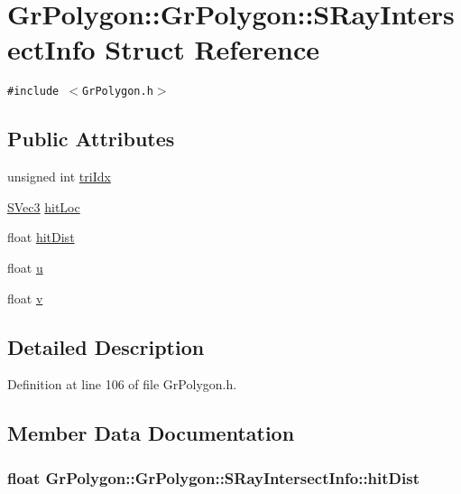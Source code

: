 \hypertarget{struct_gr_polygon_1_1_s_ray_intersect_info}{
\section{GrPolygon::GrPolygon::SRayIntersectInfo Struct Reference}
\label{struct_gr_polygon_1_1_s_ray_intersect_info}
}
{\tt \#include $<$GrPolygon.h$>$}

\subsection*{Public Attributes}
\begin{CompactItemize}
\item 
unsigned int \hyperlink{struct_gr_polygon_1_1_s_ray_intersect_info_c4b5c6b949c43838c3f83283daa1c9b1}{triIdx}
\item 
\hyperlink{struct_s_vec3}{SVec3} \hyperlink{struct_gr_polygon_1_1_s_ray_intersect_info_087c70a3931cf6fcafc953d94954bcb8}{hitLoc}
\item 
float \hyperlink{struct_gr_polygon_1_1_s_ray_intersect_info_6c39b205f7e2f9fb4490a87df5a55d24}{hitDist}
\item 
float \hyperlink{struct_gr_polygon_1_1_s_ray_intersect_info_b6f863c07d54a23eb721e226f61012f2}{u}
\item 
float \hyperlink{struct_gr_polygon_1_1_s_ray_intersect_info_c3a6d5dd4e36f69a660d74430f51e092}{v}
\end{CompactItemize}


\subsection{Detailed Description}


Definition at line 106 of file GrPolygon.h.

\subsection{Member Data Documentation}
\hypertarget{struct_gr_polygon_1_1_s_ray_intersect_info_6c39b205f7e2f9fb4490a87df5a55d24}{
\subsubsection[{hitDist}]{\setlength{\rightskip}{0pt plus 5cm}float GrPolygon::GrPolygon::SRayIntersectInfo::hitDist}}
\label{struct_gr_polygon_1_1_s_ray_intersect_info_6c39b205f7e2f9fb4490a87df5a55d24}




